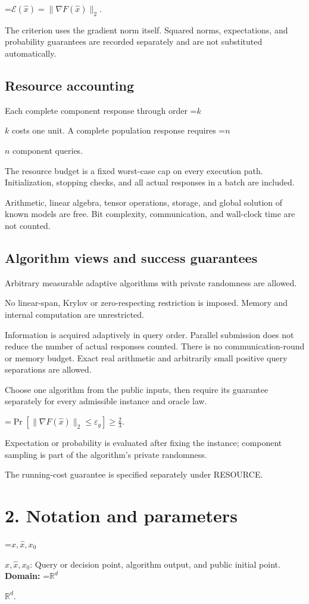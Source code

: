 \documentclass[10pt,a4paper]{article}
\newcommand{\AtlasMath}[1]{\par\begingroup\centering\setbox0=\hbox{$\displaystyle #1$}\ifdim\wd0>1.4\linewidth\typeout{ATLAS WIDE FORMULA: \the\wd0}\fi\ifdim\wd0>\linewidth\resizebox{\linewidth}{!}{\box0}\else\box0\fi\par\endgroup}
\newcommand{\AtlasInlineMath}[1]{\begingroup\setbox0=\hbox{$#1$}\ifdim\wd0>.4\linewidth\endgroup\AtlasMath{#1}\else\endgroup$#1$\fi}
\begin{document}
\AtlasMath{\mathcal{E}(\widehat{x})=\|\nabla F(\widehat{x})\|_2.}


The criterion uses the gradient norm itself. Squared norms, expectations, and probability guarantees are recorded separately and are not substituted automatically.

\subsection{Resource accounting}
Each complete component response through order \AtlasInlineMath{k} costs one unit. A complete population response requires \AtlasInlineMath{n} component queries.

The resource budget is a fixed worst-case cap on every execution path. Initialization, stopping checks, and all actual responses in a batch are included.

Arithmetic, linear algebra, tensor operations, storage, and global solution of known models are free. Bit complexity, communication, and wall-clock time are not counted.

\subsection{Algorithm views and success guarantees}
Arbitrary measurable adaptive algorithms with private randomness are allowed.

No linear-span, Krylov or zero-respecting restriction is imposed. Memory and internal computation are unrestricted.

Information is acquired adaptively in query order. Parallel submission does not reduce the number of actual responses counted. There is no communication-round or memory budget. Exact real arithmetic and arbitrarily small positive query separations are allowed.

Choose one algorithm from the public inputs, then require its guarantee separately for every admissible instance and oracle law.


\AtlasMath{\Pr\!\left[\|\nabla F(\widehat{x})\|_2\le \varepsilon_g\right]\ge\frac23.}


Expectation or probability is evaluated after fixing the instance; component sampling is part of the algorithm's private randomness.

The running-cost guarantee is specified separately under RESOURCE.

\section{2. Notation and parameters}
\AtlasInlineMath{x,\widehat{x},x_0}: Query or decision point, algorithm output, and public initial point. \textbf{Domain:} \AtlasInlineMath{\mathbb{R}^d}.
\end{document}
